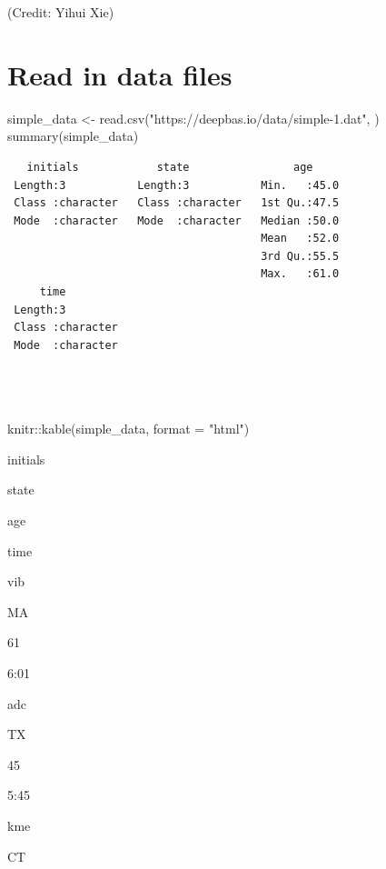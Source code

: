\documentclass[
]{book}
\newenvironment{Shaded}{\begin{snugshade}}{\end{snugshade}}
\newcommand{\AttributeTok}[1]{\textcolor[rgb]{0.77,0.63,0.00}{#1}}
\newcommand{\FunctionTok}[1]{\textcolor[rgb]{0.00,0.00,0.00}{#1}}
\newcommand{\NormalTok}[1]{#1}
\newcommand{\OtherTok}[1]{\textcolor[rgb]{0.56,0.35,0.01}{#1}}
\newcommand{\SpecialCharTok}[1]{\textcolor[rgb]{0.00,0.00,0.00}{#1}}
\newcommand{\StringTok}[1]{\textcolor[rgb]{0.31,0.60,0.02}{#1}}
\begin{document}
(Credit: Yihui Xie)

\hypertarget{read-in-data-files}{%
\section{Read in data files}\label{read-in-data-files}}

\begin{Shaded}
\begin{Highlighting}[]
\NormalTok{simple\_data }\OtherTok{\textless{}{-}} \FunctionTok{read.csv}\NormalTok{(}\StringTok{"https://deepbas.io/data/simple{-}1.dat"}\NormalTok{, )}
\FunctionTok{summary}\NormalTok{(simple\_data) }
\end{Highlighting}
\end{Shaded}

\begin{verbatim}
   initials            state                age      
 Length:3           Length:3           Min.   :45.0  
 Class :character   Class :character   1st Qu.:47.5  
 Mode  :character   Mode  :character   Median :50.0  
                                       Mean   :52.0  
                                       3rd Qu.:55.5  
                                       Max.   :61.0  
     time          
 Length:3          
 Class :character  
 Mode  :character  
                   
                   
                   
\end{verbatim}

\begin{Shaded}
\begin{Highlighting}[]
\NormalTok{knitr}\SpecialCharTok{::}\FunctionTok{kable}\NormalTok{(simple\_data, }\AttributeTok{format =} \StringTok{"html"}\NormalTok{)}
\end{Highlighting}
\end{Shaded}

initials

state

age

time

vib

MA

61

6:01

adc

TX

45

5:45

kme

CT
\end{document}
